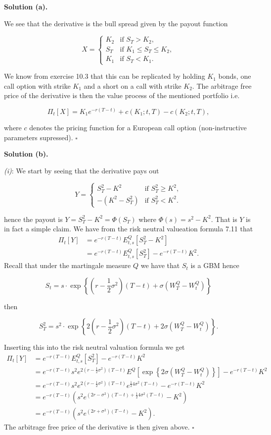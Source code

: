 \documentclass[a4paper,12pt,openany]{book}
\begin{document}
\textbf{Solution (a).}

We see that the derivative is the bull spread given by the payout function

\[
X=
\begin{cases}
  K_2 & \text{if }S_T>K_2,\\
  S_T & \text{if }K_1\le S_T\le K_2,\\
  K_1 &\text{if }S_T< K_1.
\end{cases}
\]

We know from exercise 10.3 that this can be replicated by holding \(K_1\) bonds, one call option with strike \(K_1\) and a short on a call with strike \(K_2\). The arbitrage free price of the derivative is then the value process of the mentioned portfolio i.e.

\[
\Pi_t[X]=K_1 e^{-r(T-t)}+c(K_1;t,T)-c(K_2;t,T),
\]

where \(c\) denotes the pricing function for a European call option (non-instructive parameters supressed). \(\square\)

\noindent\makebox[\linewidth]{\rule{\textwidth}{0.4pt}}

\textbf{Solution (b).}

\emph{(i)}: We start by seeing that the derivative pays out

\[
Y=
\begin{cases}
  S_T^2-K^2 & \text{if }S_T^2\ge K^2,\\
  -(K^2-S_T^2) &\text{if }S_T^2< K^2.
\end{cases}
\]

hence the payout is \(Y=S_T^2-K^2=\Phi(S_T)\) where \(\Phi(s)=s^2-K^2\). That is \(Y\) is in fact a simple claim. We have from the risk neutral valueation formula 7.11 that
\begin{align*}
\Pi_t[Y]&=e^{-r(T-t)}E^Q_{t,s}[S_T^2-K^2]\\
&=e^{-r(T-t)}E^Q_{t,s}[S_T^2]-e^{-r(T-t)}K^2.
\end{align*}
Recall that under the martingale measure \(Q\) we have that \(S_t\) is a GBM hence

\[
S_t=s\cdot \exp\left\{\left(r-\frac{1}{2}\sigma^2\right)(T-t)+\sigma\left(W_T^Q-W_t^Q\right)\right\}
\]

then

\[
S_T^2=s^2\cdot \exp\left\{2\left(r-\frac{1}{2}\sigma^2\right)(T-t)+2\sigma\left(W_T^Q-W_t^Q\right)\right\}.
\]

Inserting this into the risk neutral valuation formula we get
\begin{align*}
\Pi_t[Y]&=e^{-r(T-t)}E^Q_{t,s}[S_T^2]-e^{-r(T-t)}K^2\\
&=e^{-r(T-t)}s^2e^{2\left(r-\frac{1}{2}\sigma^2\right)(T-t)} E^Q\left[\exp\left\{2\sigma\left(W_T^Q-W_t^Q\right)\right\}\right]-e^{-r(T-t)}K^2\\
&=e^{-r(T-t)}s^2e^{2\left(r-\frac{1}{2}\sigma^2\right)(T-t)}e^{\frac{1}{2}4\sigma^2(T-t)}-e^{-r(T-t)}K^2\\
&=e^{-r(T-t)}\left(s^2e^{(2r-\sigma^2)(T-t)+\frac{1}{2}4\sigma^2(T-t)}-K^2\right)\\
&=e^{-r(T-t)}\left(s^2e^{(2r+\sigma^2)(T-t)}-K^2\right).
\end{align*}
The arbitrage free price of the derivative is then given above. \(\square\)
\end{document}
